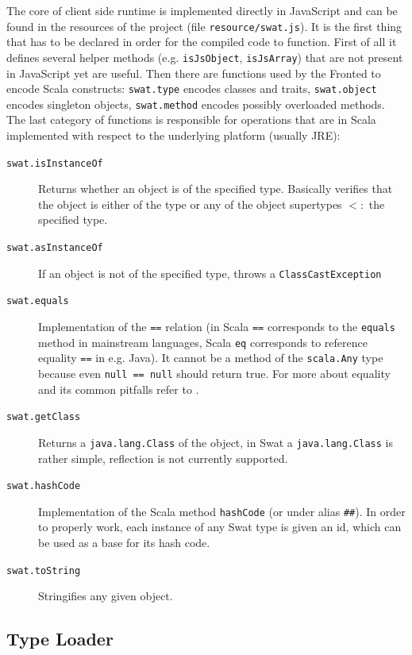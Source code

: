 \documentclass[12pt,a4paper]{report}
\begin{document}
The core of client side runtime is implemented directly in JavaScript and can be found in the resources of the project (file \texttt{resource/swat.js}). It is the first thing that has to be declared in order for the compiled code to function. First of all it defines several helper methods (e.g. \texttt{isJsObject}, \texttt{isJsArray}) that are not present in JavaScript yet are useful. Then there are functions used by the Fronted to encode Scala constructs: \texttt{swat.type} encodes classes and traits, \texttt{swat.object} encodes singleton objects, \texttt{swat.method} encodes possibly overloaded methods. The last category of functions is responsible for operations that are in Scala implemented with respect to the underlying platform (usually JRE):

\begin{description}
\item[\texttt{swat.isInstanceOf}] Returns whether an object is of the specified type. Basically verifies that the object is either of the type or any of the object supertypes $<:$ the specified type.
\item[\texttt{swat.asInstanceOf}] If an object is not of the specified type, throws a \texttt{ClassCastException}
\item[\texttt{swat.equals}] Implementation of the \texttt{==} relation (in Scala \texttt{==} corresponds to the \texttt{equals} method in mainstream languages, Scala \texttt{eq} corresponds to reference equality \texttt{==} in e.g. Java). It cannot be a method of the \texttt{scala.Any} type because even \texttt{null == null} should return true. For more about equality and its common pitfalls refer to \cite{Equality}.
\item[\texttt{swat.getClass}] Returns a \texttt{java.lang.Class} of the object, in Swat a \texttt{java.lang.Class} is rather simple, reflection is not currently supported. 
\item[\texttt{swat.hashCode}] Implementation of the Scala method \texttt{hashCode} (or under alias \texttt{\#\#}). In order to properly work, each instance of any Swat type is given an id, which can be used as a base for its hash code.
\item[\texttt{swat.toString}] Stringifies any given object.
\end{description}

\subsection{Type Loader}
\end{document}
